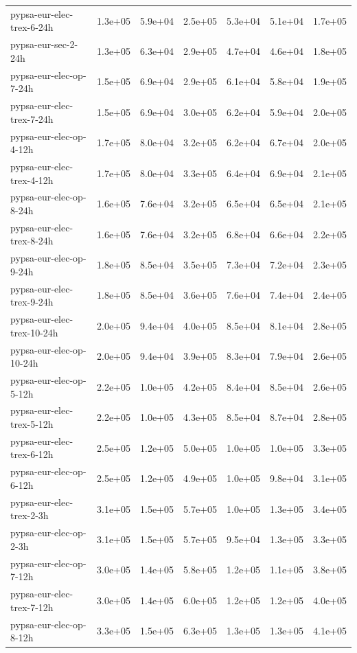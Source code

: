 \documentclass[a4paper]{article}
\newcommand{\0}{\mathbf 0}
\begin{document}
{\begin{longtable}{l|rrr|rrr}
pypsa-eur-elec-trex-6-24h & 1.3e+05 & 5.9e+04 & 2.5e+05 & 5.3e+04 & 5.1e+04 & 1.7e+05 \\
pypsa-eur-sec-2-24h & 1.3e+05 & 6.3e+04 & 2.9e+05 & 4.7e+04 & 4.6e+04 & 1.8e+05 \\
pypsa-eur-elec-op-7-24h & 1.5e+05 & 6.9e+04 & 2.9e+05 & 6.1e+04 & 5.8e+04 & 1.9e+05 \\
pypsa-eur-elec-trex-7-24h & 1.5e+05 & 6.9e+04 & 3.0e+05 & 6.2e+04 & 5.9e+04 & 2.0e+05 \\
pypsa-eur-elec-op-4-12h & 1.7e+05 & 8.0e+04 & 3.2e+05 & 6.2e+04 & 6.7e+04 & 2.0e+05 \\
pypsa-eur-elec-trex-4-12h & 1.7e+05 & 8.0e+04 & 3.3e+05 & 6.4e+04 & 6.9e+04 & 2.1e+05 \\
pypsa-eur-elec-op-8-24h & 1.6e+05 & 7.6e+04 & 3.2e+05 & 6.5e+04 & 6.5e+04 & 2.1e+05 \\
pypsa-eur-elec-trex-8-24h & 1.6e+05 & 7.6e+04 & 3.2e+05 & 6.8e+04 & 6.6e+04 & 2.2e+05 \\
pypsa-eur-elec-op-9-24h & 1.8e+05 & 8.5e+04 & 3.5e+05 & 7.3e+04 & 7.2e+04 & 2.3e+05 \\
pypsa-eur-elec-trex-9-24h & 1.8e+05 & 8.5e+04 & 3.6e+05 & 7.6e+04 & 7.4e+04 & 2.4e+05 \\
pypsa-eur-elec-trex-10-24h & 2.0e+05 & 9.4e+04 & 4.0e+05 & 8.5e+04 & 8.1e+04 & 2.8e+05 \\
pypsa-eur-elec-op-10-24h & 2.0e+05 & 9.4e+04 & 3.9e+05 & 8.3e+04 & 7.9e+04 & 2.6e+05 \\
pypsa-eur-elec-op-5-12h & 2.2e+05 & 1.0e+05 & 4.2e+05 & 8.4e+04 & 8.5e+04 & 2.6e+05 \\
pypsa-eur-elec-trex-5-12h & 2.2e+05 & 1.0e+05 & 4.3e+05 & 8.5e+04 & 8.7e+04 & 2.8e+05 \\
pypsa-eur-elec-trex-6-12h & 2.5e+05 & 1.2e+05 & 5.0e+05 & 1.0e+05 & 1.0e+05 & 3.3e+05 \\
pypsa-eur-elec-op-6-12h & 2.5e+05 & 1.2e+05 & 4.9e+05 & 1.0e+05 & 9.8e+04 & 3.1e+05 \\
pypsa-eur-elec-trex-2-3h & 3.1e+05 & 1.5e+05 & 5.7e+05 & 1.0e+05 & 1.3e+05 & 3.4e+05 \\
pypsa-eur-elec-op-2-3h & 3.1e+05 & 1.5e+05 & 5.7e+05 & 9.5e+04 & 1.3e+05 & 3.3e+05 \\
pypsa-eur-elec-op-7-12h & 3.0e+05 & 1.4e+05 & 5.8e+05 & 1.2e+05 & 1.1e+05 & 3.8e+05 \\
pypsa-eur-elec-trex-7-12h & 3.0e+05 & 1.4e+05 & 6.0e+05 & 1.2e+05 & 1.2e+05 & 4.0e+05 \\
pypsa-eur-elec-op-8-12h & 3.3e+05 & 1.5e+05 & 6.3e+05 & 1.3e+05 & 1.3e+05 & 4.1e+05 \\

\end{longtable}}
\end{document}
